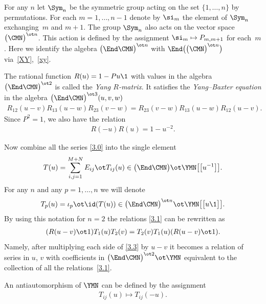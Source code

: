 For any $n$ let $\Sym_n$ be the symmetric group acting
on the set $\{1,\dots, n\}$ by permutations. For each $m=1,\dots, n-1$
denote by $\si_m$ the element of $\Sym_n$ exchanging~$m$ and $m+1 $.
The group $\Sym_n$ also acts on the vector space $\big(\CMN\big)^{\ot n}$.
This action is defined by the assignment
$\si_m\mapsto P_{m,m+1}$ for each~$m $.
Here we identify the algebra
$\big(\End\CMN\big)^{\ot n}$ with $\End\big(\big(\CMN\big)^{\ot n}\big)$ via~\eqref{XY},~\eqref{xy}.

The rational function $R(u)=1-P u\1$ with values in the algebra
$\big(\End\CMN\big)^{\ot 2}$ is called the {\it Yang $R$-matrix}.
It satisfies the {\it Yang--Baxter equation}
in the algebra $\big(\End\CMN\big)^{\ot 3}(u,v,w)$
\begin{gather}\label{3.6}
R_{12}(u-v) R_{13}(u-w) R_{23}(v-w)=R_{23}(v-w) R_{13}(u-w) R_{12}(u-v) .
\end{gather}
Since $P^2=1 $, we also have the relation
\begin{gather}\label{3.52}
R(-u) R(u)=1-u^{-2} .
\end{gather}

Now combine all the series \eqref{3.0} into the single element
\begin{gather}\label{tu}
T(u)=\sum_{i,j=1}^{M+N} E_{ij}\ot T_{ij}(u)
\in\big(\End\CMN\big)\ot\YMN \big[\big[u^{-1}\big]\big] .
\end{gather}
For any $n$ and any $p=1,\dots, n$ we will denote
\begin{gather}
T_p(u)=\iota_p\ot\id ( T(u)) \in\big(\End\CMN\big)^{\ot n}\ot\YMN \big[\big[u\1\big]\big] .\label{3.22}
\end{gather}
By using this notation for $n=2$
the relations \eqref{3.1} can be rewritten as
\begin{gather}\label{3.3}
(R (u-v)\ot1) T_1(u) T_2(v)=T_2(v) T_1(u) (R (u-v)\ot1) .
\end{gather}
Namely, after multiplying each side of \eqref{3.3} by $u-v$ it becomes
a relation of series in $u$, $v$ with coefficients in %
$\big(\End\CMN\big)^{\ot 2}\ot\YMN$
equivalent to the collection of all the relations~\eqref{3.1}.

\begin{Proposition}\label{m}
An antiautomorphism of $\YMN$ can be defined by the assignment
\begin{gather}\label{M}
T_{ij}(u)\mapsto T_{ij}(-u) .
\end{gather}
\end{Proposition}

